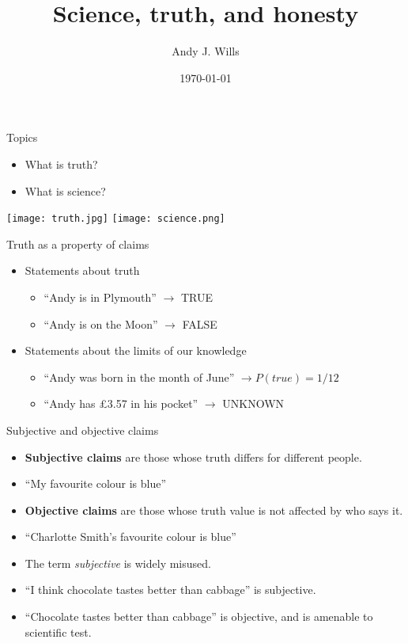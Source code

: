 \documentclass{beamer}
\title[Critical Thinking]{Science, truth, and honesty }
\author{Andy J. Wills}
\date{\today}
\begin{document}
\frame{\titlepage}

\begin{frame}{Topics}
	\begin{itemize}
		\item What is truth? 
		\item What is science?  
	\end{itemize}
	\centerline{
	\texttt{[image: truth.jpg]}
	\texttt{[image: science.png]}
	}
\end{frame}

\begin{frame}{Truth as a property of claims}
	\begin{itemize}
		\item Statements about truth
		\begin{itemize}
			\item ``Andy is in Plymouth'' $\to$ TRUE 
			\item ``Andy is on the Moon'' $\to$ FALSE 
		\end{itemize}
		\item Statements about the limits of our knowledge
		\begin{itemize}
			\item ``Andy was born in the month of June'' $\to P(true) = 1/12$ 
			\item ``Andy has \pounds 3.57 in his pocket'' $\to$ UNKNOWN
		\end{itemize}  
	\end{itemize}
\end{frame}

\begin{frame}{Subjective and objective claims}
	\begin{itemize}
		\item \textbf{Subjective claims} are those whose truth differs for different people.
		\item ``My favourite colour is blue''
		\item \textbf{Objective claims} are those whose truth value is not affected by who says it.
		\item ``Charlotte Smith's favourite colour is blue''
		\item The term \emph{subjective} is widely misused.
		\item ``I think chocolate tastes better than cabbage'' is subjective.
		\item ``Chocolate tastes better than cabbage'' is objective, and is amenable to scientific test.
	\end{itemize}
\end{frame}
\end{document}
